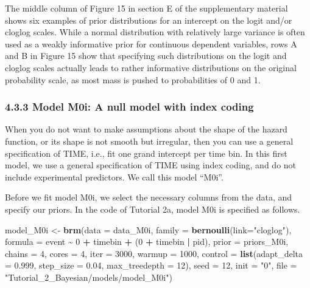 \documentclass[
  man, donotrepeattitle,floatsintext]{apa6}
\newenvironment{Shaded}{\begin{snugshade}}{\end{snugshade}}
\newcommand{\AttributeTok}[1]{\textcolor[rgb]{0.13,0.29,0.53}{#1}}
\newcommand{\DecValTok}[1]{\textcolor[rgb]{0.00,0.00,0.81}{#1}}
\newcommand{\FloatTok}[1]{\textcolor[rgb]{0.00,0.00,0.81}{#1}}
\newcommand{\FunctionTok}[1]{\textcolor[rgb]{0.13,0.29,0.53}{\textbf{#1}}}
\newcommand{\NormalTok}[1]{#1}
\newcommand{\OtherTok}[1]{\textcolor[rgb]{0.56,0.35,0.01}{#1}}
\newcommand{\SpecialCharTok}[1]{\textcolor[rgb]{0.81,0.36,0.00}{\textbf{#1}}}
\newcommand{\StringTok}[1]{\textcolor[rgb]{0.31,0.60,0.02}{#1}}
\begin{document}
The middle column of Figure 15 in section E of the supplementary material shows six examples of prior distributions for an intercept on the logit and/or cloglog scales. While a normal distribution with relatively large variance is often used as a weakly informative prior for continuous dependent variables, rows A and B in Figure 15 show that specifying such distributions on the logit and cloglog scales actually leads to rather informative distributions on the original probability scale, as most mass is pushed to probabilities of 0 and 1.

\subsubsection{4.3.3 Model M0i: A null model with index coding}\label{model-m0i-a-null-model-with-index-coding}

When you do not want to make assumptions about the shape of the hazard function, or its shape is not smooth but irregular, then you can use a general specification of TIME, i.e., fit one grand intercept per time bin. In this first model, we use a general specification of TIME using index coding, and do not include experimental predictors. We call this model ``M0i''.

Before we fit model M0i, we select the necessary columns from the data, and specify our priors. In the code of Tutorial 2a, model M0i is specified as follows.

\begin{Shaded}
\begin{Highlighting}[]
\NormalTok{model\_M0i }\OtherTok{\textless{}{-}}                    
   \FunctionTok{brm}\NormalTok{(}\AttributeTok{data =}\NormalTok{ data\_M0i,}
       \AttributeTok{family =} \FunctionTok{bernoulli}\NormalTok{(}\AttributeTok{link=}\StringTok{"cloglog"}\NormalTok{),}
       \AttributeTok{formula =}\NormalTok{ event }\SpecialCharTok{\textasciitilde{}} \DecValTok{0} \SpecialCharTok{+}\NormalTok{ timebin }\SpecialCharTok{+}\NormalTok{ (}\DecValTok{0} \SpecialCharTok{+}\NormalTok{ timebin }\SpecialCharTok{|}\NormalTok{ pid),}
       \AttributeTok{prior =}\NormalTok{ priors\_M0i,}
       \AttributeTok{chains =} \DecValTok{4}\NormalTok{, }\AttributeTok{cores =} \DecValTok{4}\NormalTok{, }
       \AttributeTok{iter =} \DecValTok{3000}\NormalTok{, }\AttributeTok{warmup =} \DecValTok{1000}\NormalTok{,}
       \AttributeTok{control =} \FunctionTok{list}\NormalTok{(}\AttributeTok{adapt\_delta =} \FloatTok{0.999}\NormalTok{, }
                      \AttributeTok{step\_size =} \FloatTok{0.04}\NormalTok{, }
                      \AttributeTok{max\_treedepth =} \DecValTok{12}\NormalTok{),}
       \AttributeTok{seed =} \DecValTok{12}\NormalTok{, }\AttributeTok{init =} \StringTok{"0"}\NormalTok{,}
       \AttributeTok{file =} \StringTok{"Tutorial\_2\_Bayesian/models/model\_M0i"}\NormalTok{)}
\end{Highlighting}
\end{Shaded}
\end{document}
